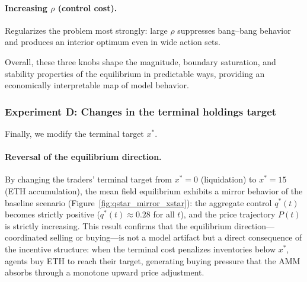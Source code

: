 \documentclass[11pt]{article}
\theoremstyle{definition}
\begin{document}
\paragraph*{Increasing $\rho$ (control cost).}
Regularizes the problem most strongly: large $\rho$ suppresses bang--bang 
behavior and produces an interior optimum even in wide action sets.

Overall, these three knobs shape the magnitude, boundary saturation, and stability properties of the equilibrium in predictable ways, providing an economically interpretable map of model behavior.

\subsubsection*{Experiment D: Changes in the terminal holdings target}
Finally, we modify the terminal target $x^*$.

\paragraph{Reversal of the equilibrium direction.}
By changing the traders' terminal target from $x^* = 0$ (liquidation) to $x^* = 15$ (ETH accumulation), the mean field equilibrium exhibits a mirror behavior of the baseline scenario (Figure~\ref{fig:qstar_mirror_xstar}): the aggregate control $q^*(t)$ becomes strictly positive ($q^*(t) \approx 0.28$ for all $t$), and the price trajectory $P(t)$ is strictly increasing. This result confirms that the equilibrium direction---coordinated selling or buying---is not a model artifact but a direct consequence of the incentive structure: when the terminal cost penalizes inventories below $x^*$, agents buy ETH to reach their target, generating buying pressure that the AMM absorbs through a monotone upward price adjustment.
\end{document}
